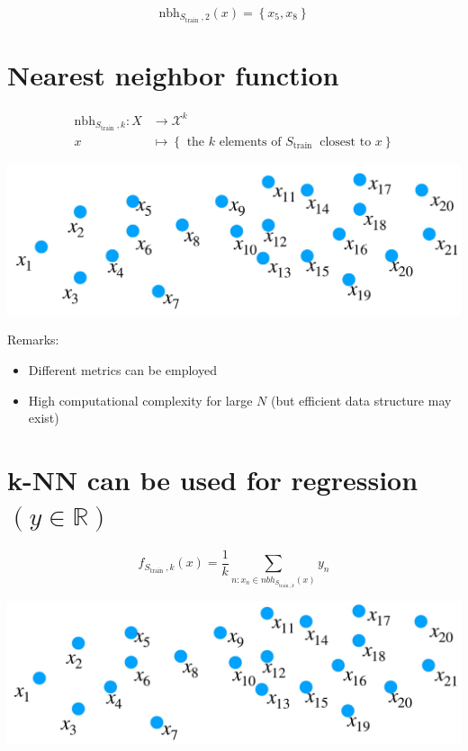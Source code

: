 \documentclass[10pt]{article}
\begin{document}
$$
\mathrm{nbh}_{S_{\text {train }}, 2}(x)=\left\{x_{5}, x_{8}\right\}
$$

\section*{Nearest neighbor function}
$$
\begin{aligned}
\mathrm{nbh}_{S_{\text {train }}, k}: X & \rightarrow \mathscr{X}^{k} \\
x & \mapsto\left\{\text { the } k \text { elements of } S_{\text {train }} \text { closest to } x\right\}
\end{aligned}
$$

\begin{center}
\includegraphics[max width=\textwidth]{2023_12_30_f937b0007b5d87b39f79g-09}
\end{center}

Remarks:

\begin{itemize}
  \item Different metrics can be employed
  \item High computational complexity for large $N$ (but efficient data structure may exist)
\end{itemize}

\section*{k-NN can be used for regression $(y \in \mathbb{R})$}
$$
f_{S_{\text {train }}, k}(x)=\frac{1}{k} \sum_{n: x_{n} \in n b h_{S_{\text {train }, k}}(x)} y_{n}
$$

\begin{center}
\includegraphics[max width=\textwidth]{2023_12_30_f937b0007b5d87b39f79g-10}
\end{center}
\end{document}
